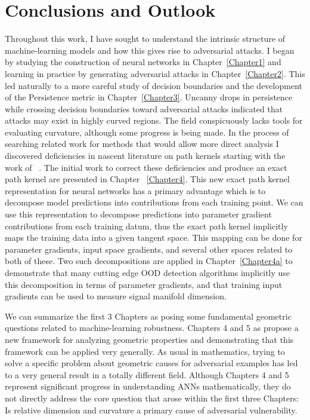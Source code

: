 \chapter{Conclusions and Outlook}

\label{Chapter5} %

Throughout this work, I have sought to understand the intrinsic
structure of machine-learning models and how this gives
rise to adversarial attacks. I began by studying the construction of
neural networks in Chapter~\ref{Chapter1} and learning in practice by generating adversarial
attacks in Chapter~\ref{Chapter2}. This led naturally to a more careful study of decision
boundaries and the development of the Persistence metric in Chapter~\ref{Chapter3}. Uncanny drops in persistence while crossing
decision boundaries toward adversarial attacks indicated that attacks
may exist in highly curved regions. The field conspicuously lacks
tools for evaluating curvature, although some progress is being
made. In the process of searching related work for methods that would allow more
direct analysis I discovered deficiencies in nascent literature on
path kernels starting with the work of ~\citet{domingos2020}. The
initial work to correct these deficiencies and produce an exact path
kernel are presented in Chapter ~\ref{Chapter4}. This new exact path kernel
representation for neural networks has a primary advantage which is to
decompose model predictions into contributions from each training
point. We can use this representation to decompose predictions into
parameter gradient contributions from each training datum, thus the exact path kernel implicitly maps the
training data into a given tangent space. This mapping can be done for
parameter gradients, input space gradients, and several other
spaces related to both of these. Two such decompositions are applied
in Chapter~\ref{Chapter4a} to demonstrate that many cutting edge OOD
detection algorithms implicitly use this decomposition in terms of
parameter gradients, and that training input gradients can be
used to measure signal manifold dimension.

We can summarize the first 3 Chapters as posing some fundamental
geometric questions related to machine-learning robustness. 
Chapters 4 and 5 as propose a new framework for analyzing geometric
properties and demonstrating that this framework can be applied very
generally. As usual in mathematics, trying to solve a specific problem
about geometric causes for adversarial examples has led to a very
general result in a totally different field. Although Chapters 4 and 5
represent significant progress in understanding ANNs mathematically,
they do not directly address the core question that arose within the
first three Chapters: Is relative dimension and curvature a primary
cause of adversarial vulnerability. 

